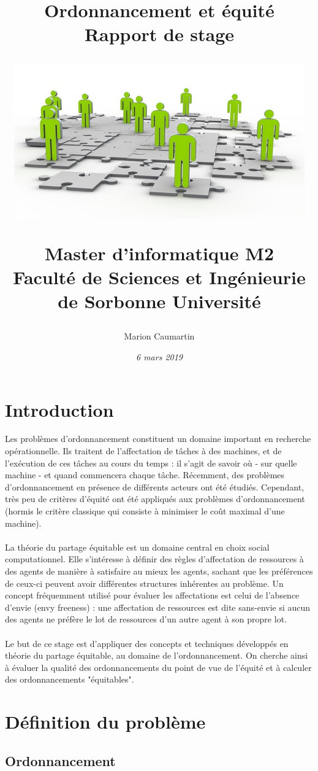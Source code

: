 \documentclass[12pt]{article}
\title{\vspace{20mm}
        \LARGE \textbf {Ordonnancement et équité}\\
        \vspace{8mm}
        \large \textbf{Rapport de stage}\\
        \vspace{10mm}
        \begin{center}
            \includegraphics[scale = 1]{main_title.jpg}
        \end{center}
        \author{Marion Caumartin}
        \large {Master d'informatique M2}\\
          \vspace{5mm}
        \large {Faculté de Sciences et Ingénieurie de Sorbonne Université \vspace{15mm}}\\ 
        \date{\vspace{10mm} \textsf{\textrm{\textit{6 mars 2019}}}}}
\theoremstyle{definition}
\begin{document}
\maketitle
\thispagestyle{empty}

\newpage

\tableofcontents
\thispagestyle{empty}

\newpage
\setcounter{page}{1}
\section{Introduction}\label{intro}
\noindent
Les problèmes d'ordonnancement constituent un domaine important en recherche opérationnelle. Ils traitent de l'affectation de tâches à des machines, et de l'exécution de ces tâches au cours du temps : il s'agit de savoir où - sur quelle machine - et quand commencera chaque tâche. Récemment, des problèmes d'ordonnancement en présence de différents acteurs ont été étudiés. Cependant, très peu de critères d'équité ont été appliqués aux problèmes d'ordonnancement (hormis le critère classique qui consiste à minimiser le coût maximal d'une machine).\\\\
La théorie du partage équitable est un domaine central en choix social computationnel. Elle s'intéresse à définir des règles d'affectation de ressources à des agents de manière à satisfaire au mieux les agents, sachant que les préférences de ceux-ci peuvent avoir différentes structures inhérentes au problème. Un concept fréquemment utilisé pour évaluer les affectations est celui de l'absence d'envie (envy freeness) : une affectation de ressources est dite sans-envie si aucun des agents ne préfère le lot de ressources d'un autre agent à son propre lot.\\\\
Le but de ce stage est d'appliquer des concepts et techniques développés en théorie du partage équitable, au domaine de l'ordonnancement. On cherche ainsi à évaluer la qualité des ordonnancements du point de vue de l'équité et à calculer des ordonnancements "équitables".

\newpage

\section{Définition du problème}\label{def_pb}

\subsection{Ordonnancement}\label{ordo}
\end{document}
